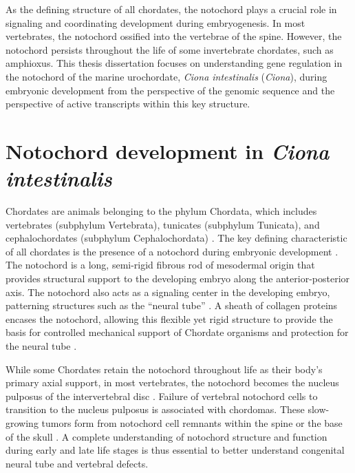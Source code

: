 \begin{dissertationintroduction}
    As the defining structure of all chordates, the notochord plays a crucial role in signaling and coordinating development during embryogenesis. In most vertebrates, the notochord ossified into the vertebrae of the spine. However, the notochord persists throughout the life of some invertebrate chordates, such as amphioxus. This thesis dissertation focuses on understanding gene regulation in the notochord of the marine urochordate, \textit{Ciona intestinalis} (\textit{Ciona}), during embryonic development from the perspective of the genomic sequence and the perspective of active transcripts within this key structure.

    \section{Notochord development in \textit{Ciona intestinalis}}

    Chordates are animals belonging to the phylum Chordata, which includes vertebrates (subphylum Vertebrata), tunicates (subphylum Tunicata), and cephalochordates (subphylum Cephalochordata) \cite{holland2005}. The key defining characteristic of all chordates is the presence of a notochord during embryonic development \cite{stemple2004, holland2005, stemple2005, corallo2015, balmer2016, debree2018}. The notochord is a long, semi-rigid fibrous rod of mesodermal origin that provides structural support to the developing embryo along the anterior-posterior axis. The notochord also acts as a signaling center in the developing embryo, patterning structures such as the “neural tube” \cite{stemple2005, corallo2015, balmer2016}. A sheath of collagen proteins encases the notochord, allowing this flexible yet rigid structure to provide the basis for controlled mechanical support of Chordate organisms and protection for the neural tube \cite{corallo2015, stemple2004, stemple2005, balmer2016}.

    While some Chordates retain the notochord throughout life as their body’s primary axial support, in most vertebrates, the notochord becomes the nucleus pulposus of the intervertebral disc \cite{stemple2005, corallo2015, lawson2015, balmer2016}. Failure of vertebral notochord cells to transition to the nucleus pulposus is associated with chordomas. These slow-growing tumors form from notochord cell remnants within the spine or the base of the skull \cite{corallo2015, debree2018}. A complete understanding of notochord structure and function during early and late life stages is thus essential to better understand congenital neural tube and vertebral defects.


\end{dissertationintroduction}
